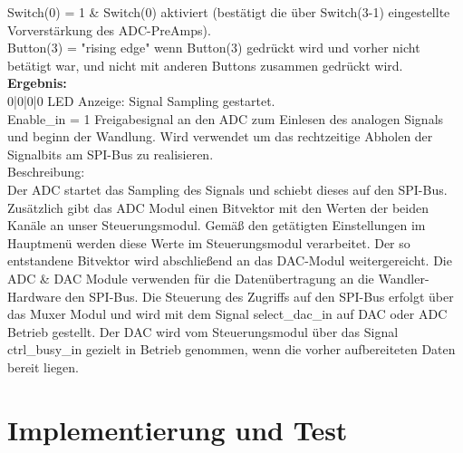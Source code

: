 \noindent Switch(0) = 1 \&	Switch(0) aktiviert (bestätigt die über Switch(3-1) eingestellte Vorverstärkung des ADC-PreAmps).\\

\noindent Button(3) = "rising edge"	wenn Button(3) gedrückt wird und vorher nicht betätigt war, und nicht mit anderen Buttons zusammen gedrückt wird.\\

\noindent \textbf{Ergebnis:}\\

 {\color{orange}0|0|0|0} LED Anzeige: Signal Sampling gestartet. \\

Enable\_in = 1	Freigabesignal an den ADC zum Einlesen des analogen Signals und beginn der Wandlung. Wird verwendet um das rechtzeitige Abholen der Signalbits am SPI-Bus zu realisieren.\\

\noindent Beschreibung: \\
Der ADC startet das Sampling des Signals und schiebt dieses auf den SPI-Bus. Zusätzlich gibt das ADC Modul einen Bitvektor mit den Werten der beiden Kanäle an unser Steuerungsmodul. Gemäß den getätigten  Einstellungen im Hauptmenü werden diese Werte im Steuerungsmodul verarbeitet. Der so entstandene Bitvektor wird abschließend an das DAC-Modul weitergereicht. Die ADC \& DAC Module verwenden für die Datenübertragung an die Wandler-Hardware den SPI-Bus. Die Steuerung des Zugriffs auf den SPI-Bus erfolgt über das Muxer Modul und wird mit dem Signal select\_dac\_in auf DAC oder ADC Betrieb gestellt.
Der DAC wird vom Steuerungsmodul über das Signal ctrl\_busy\_in gezielt in Betrieb genommen, wenn die vorher aufbereiteten Daten bereit liegen.
\section{Implementierung und Test}
